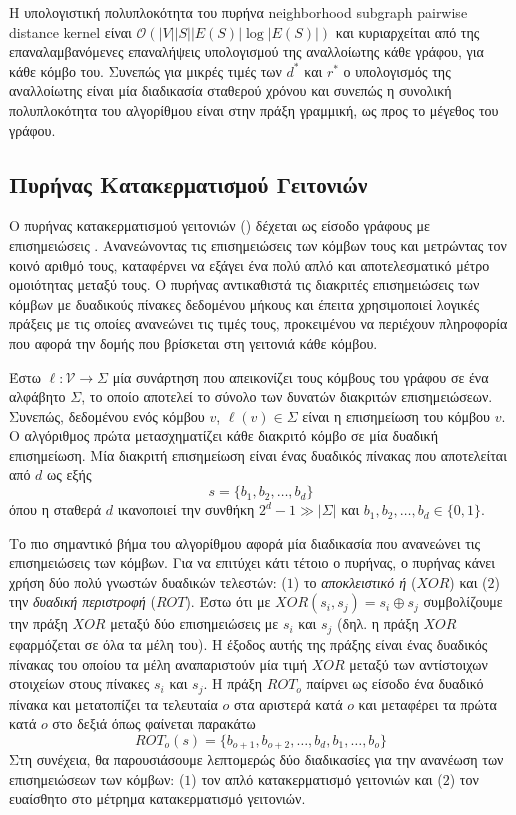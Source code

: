 Η υπολογιστική πολυπλοκότητα του πυρήνα neighborhood subgraph pairwise distance kernel είναι $\mathcal{O}(|V| |S| |E(S)| \log |E(S)|)$ και κυριαρχείται από της επαναλαμβανόμενες επαναλήψεις υπολογισμού της αναλλοίωτης κάθε γράφου, για κάθε κόμβο του.
Συνεπώς για μικρές τιμές των $d^*$ και $r^*$ ο υπολογισμός της αναλλοίωτης είναι μία διαδικασία σταθερού χρόνου και συνεπώς η συνολική πολυπλοκότητα του αλγορίθμου είναι στην πράξη γραμμική, ως προς το μέγεθος του γράφου.

\subsection{Πυρήνας Κατακερματισμού Γειτονιών}
Ο πυρήνας κατακερματισμού γειτονιών () δέχεται ως είσοδο γράφους με επισημειώσεις \cite{Hido2009}.
Ανανεώνοντας τις επισημειώσεις των κόμβων τους και μετρώντας τον κοινό αριθμό τους, καταφέρνει να εξάγει ένα πολύ απλό και αποτελεσματικό μέτρο ομοιότητας μεταξύ τους.
Ο πυρήνας αντικαθιστά τις διακριτές επισημειώσεις των κόμβων με δυαδικούς πίνακες δεδομένου μήκους και έπειτα χρησιμοποιεί λογικές πράξεις με τις οποίες ανανεώνει τις τιμές τους, προκειμένου να περιέχουν πληροφορία που αφορά την δομής που βρίσκεται στη γειτονιά κάθε κόμβου.

Έστω $\ell : \mathcal{V} \rightarrow \Sigma$ μία συνάρτηση που απεικονίζει τους κόμβους του γράφου σε ένα αλφάβητο $\Sigma$, το οποίο αποτελεί το σύνολο των δυνατών διακριτών επισημειώσεων.
Συνεπώς, δεδομένου ενός κόμβου $v$, $\ell(v) \in \Sigma$  είναι η επισημείωση του κόμβου $v$.
Ο αλγόριθμος πρώτα μετασχηματίζει κάθε διακριτό κόμβο σε μία δυαδική επισημείωση.
Μία διακριτή επισημείωση είναι ένας δυαδικός πίνακας που αποτελείται από $d$  ως εξής
\begin{equation*}
    s = \{ b_1, b_2, \ldots, b_d \}
\end{equation*}
όπου η σταθερά $d$ ικανοποιεί την συνθήκη $2^d - 1 \gg |\Sigma|$ και $b_1, b_2, \ldots, b_d \in \{0, 1\}$.

Το πιο σημαντικό βήμα του αλγορίθμου αφορά μία διαδικασία που ανανεώνει τις επισημειώσεις των κόμβων.
Για να επιτύχει κάτι τέτοιο ο πυρήνας, ο πυρήνας κάνει χρήση δύο πολύ γνωστών δυαδικών τελεστών: ($1$) το \textit{αποκλειστικό ή} ($XOR$) και ($2$) την \textit{δυαδική περιστροφή} ($ROT$).
Έστω ότι με $XOR(s_i, s_j) = s_i \oplus s_j$ συμβολίζουμε την πράξη $XOR$ μεταξύ δύο επισημειώσεις με  $s_i$ και $s_j$ (δηλ. η πράξη $XOR$ εφαρμόζεται σε όλα τα μέλη του).
Η έξοδος αυτής της πράξης είναι ένας δυαδικός πίνακας του οποίου τα μέλη αναπαριστούν μία τιμή $XOR$ μεταξύ των αντίστοιχων στοιχείων στους πίνακες $s_i$ και $s_j$.
Η πράξη $ROT_o$ παίρνει ως είσοδο ένα δυαδικό πίνακα και μετατοπίζει τα τελευταία $o$  στα αριστερά κατά $o$  και μεταφέρει τα πρώτα κατά $o$ στο δεξιά όπως φαίνεται παρακάτω
\begin{equation}
    ROT_o(s) = \{ b_{o+1}, b_{o+2}, \ldots, b_d, b_1, \ldots, b_o \}
\end{equation}
Στη συνέχεια, θα παρουσιάσουμε λεπτομερώς δύο διαδικασίες για την ανανέωση των επισημειώσεων των κόμβων: ($1$) τον απλό κατακερματισμό γειτονιών και ($2$) τον ευαίσθητο στο μέτρημα κατακερματισμό γειτονιών.

